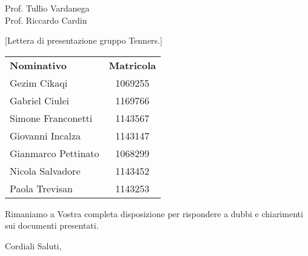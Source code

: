 \begin{letter}{\begin{flushright}
			Prof. Tullio Vardanega \\
			Prof. Riccardo Cardin 
	\end{flushright}}[Lettera di presentazione gruppo Tenners.]
\begin{center}
    	\begin{longtable}{|p{5cm}|c|}
    		\hline
        	\rowcolor{header}
    	    \textbf{Nominativo} & \textbf{Matricola} \\
    		Gezim Cikaqi & 1069255 \\
    		Gabriel Ciulei & 1169766\\
    		Simone Franconetti & 1143567\\
    		Giovanni Incalza & 1143147 \\
    		Gianmarco Pettinato & 1068299 \\
    		Nicola Salvadore & 1143452 \\
    		Paola Trevisan & 1143253\\
    		\hline
        \end{longtable}
     \end{center}
    Rimaniamo a Vostra completa disposizione per rispondere a dubbi e chiarimenti sui documenti presentati.
    \closing{ Cordiali Saluti,}
\end{letter}